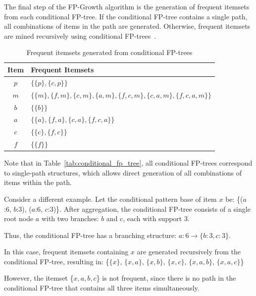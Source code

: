 The final step of the FP-Growth algorithm is the generation of frequent itemsets from each conditional FP-tree. If the conditional FP-tree contains a single path, all combinations of items in the path are generated. Otherwise, frequent itemsets are mined recursively using conditional FP-trees~\parencite{Han2000Mining}.

\begin{table}[h!]
\centering
\caption{Frequent itemsets generated from conditional FP-trees}
\label{tab:frequent_itemsets}
\begin{tabular}{|c|p{10cm}|}
\hline
\textbf{Item} & \textbf{Frequent Itemsets} \\
\hline
$p$ & $\{\{p\}, \{c,p\}\}$ \\
\hline
$m$ & $\{\{m\}, \{f,m\}, \{c,m\}, \{a,m\}, \{f,c,m\}, \{c,a,m\}, \{f,c,a,m\}\}$ \\
\hline
$b$ & $\{\{b\}\}$ \\
\hline
$a$ & $\{\{a\}, \{f,a\}, \{c,a\}, \{f,c,a\}\}$ \\
\hline
$c$ & $\{\{c\}, \{f,c\}\}$ \\
\hline
$f$ & $\{\{f\}\}$ \\
\hline
\end{tabular}
\end{table}

Note that in Table~\ref{tab:conditional_fp_tree}, all conditional FP-trees correspond to single-path structures, which allows direct generation of all combinations of items within the path.

Consider a different example. Let the conditional pattern base of item $x$ be:
\{($a$:6, $b$:3), ($a$:6, $c$:3)\}. After aggregation, the conditional FP-tree consists of a single root node $a$ with two branches: $b$ and $c$, each with support 3.

Thus, the conditional FP-tree has a branching structure:
$a:6 \rightarrow \{b:3, c:3\}$.

In this case, frequent itemsets containing $x$ are generated recursively from the conditional FP-tree, resulting in:
\{$\{x\}$, $\{x,a\}$, $\{x,b\}$, $\{x,c\}$, $\{x,a,b\}$, $\{x,a,c\}$\}

However, the itemset \{$x,a,b,c$\} is not frequent, since there is no path in the conditional FP-tree that contains all three items simultaneously.


